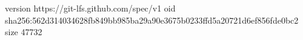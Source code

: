 version https://git-lfs.github.com/spec/v1
oid sha256:562d314034628fb849bb985ba29a90e3675b0233ffd5a20721d6ef856fde0bc2
size 47732
